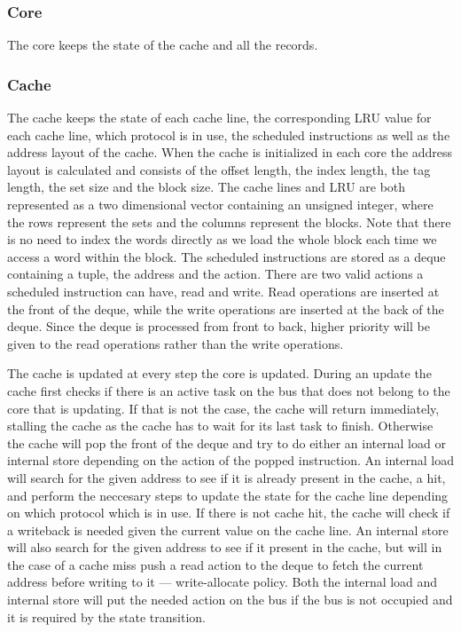 \subsubsection{Core}
The core keeps the state of the cache and all the records.

\subsubsection{Cache}
The cache keeps the state of each cache line, the corresponding LRU value for each cache line, which
protocol is in use, the scheduled instructions as well as the address layout of the cache.  When the
cache is initialized in each core the address layout is calculated and consists of the offset
length, the index length, the tag length, the set size and the block size.  The cache lines and LRU
are both represented as a two dimensional vector containing an unsigned integer, where the rows
represent the sets and the columns represent the blocks.  Note that there is no need to index the
words directly as we load the whole block each time we access a word within the block.  The
scheduled instructions are stored as a deque containing a tuple, the address and the action.  There
are two valid actions a scheduled instruction can have, read and write.  Read operations are
inserted at the front of the deque, while the write operations are inserted at the back of the
deque.  Since the deque is processed from front to back, higher priority will be given to the read
operations rather than the write operations.

The cache is updated at every step the core is updated.  During an update the cache first checks if
there is an active task on the bus that does not belong to the core that is updating.  If that is
not the case, the cache will return immediately, stalling the cache as the cache has to wait for its
last task to finish.  Otherwise the cache will pop the front of the deque and try to do either an
internal load or internal store depending on the action of the popped instruction.  An internal load
will search for the given address to see if it is already present in the cache, a hit, and perform
the neccesary steps to update the state for the cache line depending on which protocol which is in
use.  If there is not cache hit, the cache will check if a writeback is needed given the current
value on the cache line.  An internal store will also search for the given address to see if it
present in the cache, but will in the case of a cache miss push a read action to the deque to fetch
the current address before writing to it --- write-allocate policy.  Both the internal load and
internal store will put the needed action on the bus if the bus is not occupied and it is required
by the state transition.


